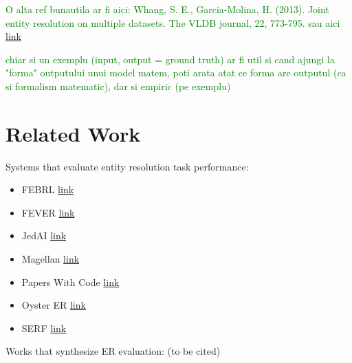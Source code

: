 \documentclass[11pt]{article}
\begin{document}
    \textcolor{green}{O alta ref bunautila ar fi aici: Whang, S. E., Garcia-Molina, H. (2013). Joint entity resolution on multiple datasets. The VLDB journal, 22, 773-795. sau aici} \href{https://pages.cs.wisc.edu/~anhai/papers1/deepmatcher-sigmod18.pdf}{link}

    \textcolor{green}{chiar si un exemplu (input, output = ground truth) ar fi util si cand ajungi la "forma" outputului unui model matem, poti arata atat ce forma are outputul (ca si formalism matematic), dar si empiric (pe exemplu)}

    \section[related]{Related Work}\label{section:related-work}

    Systems that evaluate entity resolution task performance:
    \begin{itemize}
        \item FEBRL \href{http://users.cecs.anu.edu.au/~Peter.Christen/Febrl/febrl-0.3/febrldoc-0.3/manual.html}{link}
        \item FEVER \href{https://dbs.uni-leipzig.de/en/research/projects/data_integration/fever}{link}
        \item JedAI \href{https://github.com/scify/JedAIToolkit/tree/master}{link}
        \item Magellan \href{https://sites.google.com/site/anhaidgroup/current-projects/magellan?authuser=0}{link}
        \item Papers With Code \href{https://github.com/paperswithcode}{link}
        \item Oyster ER \href{https://bitbucket.org/oysterer/oyster/src/master/}{link}
        \item SERF \href{http://infolab.stanford.edu/serf/}{link}
    \end{itemize}

    Works that synthesize ER evaluation: (to be cited)
\end{document}
